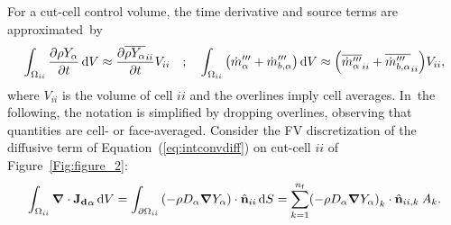 \documentclass[atmosphere,article,accept,moreauthors,pdftex]{Definitions/mdpi}
\newcommand{\dV}{{\rm d}V}
\newcommand{\dS}{{\rm d}S}
\begin{document}
For a cut-cell control volume, the time derivative and source terms are \mbox{approximated by}
\begin{equation}
  \int_{\Omega_{ii}} {\frac{\partial \rho Y_\alpha}{\partial t}} \, \dV \approx \frac{\partial \overline{\rho Y_\alpha }_{ii}}{\partial t} V_{ii} \quad ; \quad
  \int_{\Omega_{ii}} { \left( \dot{m}_\alpha''' +\dot{m}_{b,\alpha}''' \right)} \, \dV \approx \left(\overline{ \dot{m}_\alpha''' }_{ii}+ \overline{\dot{m}_{b,\alpha}'''}_{ii} \right) V_{ii} \label{eq:intcons},
\end{equation}
where $V_{ii}$ is the volume of cell $ii$ and the overlines imply cell averages. In~the following, the notation is simplified by dropping overlines, observing that quantities are cell- or face-averaged. Consider the FV discretization of the diffusive term of Equation~(\ref{eq:intconvdiff}) on cut-cell $ii$ of Figure~\ref{Fig:figure_2}:
\begin{equation}
\int_{\Omega_{ii}} { \boldsymbol{\nabla} \cdot   \mathbf{J_{d}}_\alpha   } \, \dV =
    \int_{\partial \Omega_{ii}} { \left( - \rho D_\alpha \boldsymbol{\nabla} Y_\alpha \right) \cdot \hat{\mathbf{n}}_{ii} } \, \dS = \sum^{n_{\rm f}}_{k=1}
    \left( - \rho D_\alpha \boldsymbol{\nabla} Y_\alpha \right)_k \cdot \hat{\mathbf{n}}_{ii,k} \: A_k \label{eq:discfvdiffcc}.
\end{equation}
\end{document}
